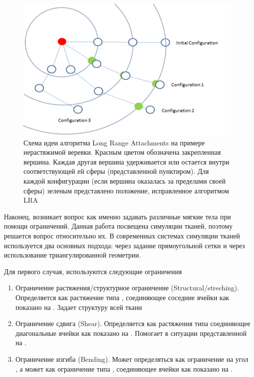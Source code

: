 	\begin{figure}[ht!] 
		\center
		\includegraphics [scale=0.9] {my_folder/images//lra}
		\caption{Схема идеи алгоритма Long Range Attachments на примере нерастяжимой веревки. Красным цветом обозначена закрепленная вершина. Каждая другая вершина удерживается или остается внутри соответствующей ей сферы (представленной пунктиром). Для каждой конфигурации (если вершина оказалась за пределами своей сферы) зеленым представлено положение, исправленное алгоритмом LRA}
		\label{fig:lra}  
	\end{figure}
	
	Наконец, возникает вопрос как именно задавать различные мягкие тела при помощи ограничений. Данная работа посвещена симуляции тканей, поэтому решается вопрос относительно их. В современных системах симуляции тканей используется два основных подхода: через задание прямоугольной сетки и через использование триангулированной геометрии.
	
	Для первого случая, используются следующие ограничения	
	\begin{enumerate}[1.]
		\item Ограничение растяжения/структурное ограничение (Structural/streching). Определяется как растяжение типа , соединяющее соседние ячейки как показано на . Задает структуру всей ткани
		\item Ограничение сдвига (Shear). Определяется как растяжения типа  соединяющее диагональные ячейки как показано на . Помогает в ситуации представленной на .
		\item Ограничение изгиба (Bending). Может определяться как ограничение на угол \cite{wang2014angle}, а может как ограничение типа , соединяющее ячейки  как показано на .
	\end{enumerate}
	
